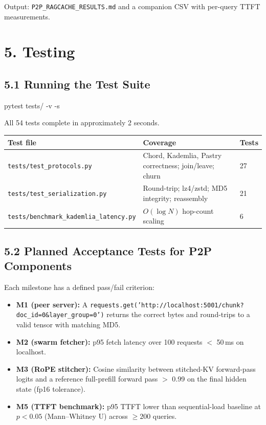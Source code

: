 \documentclass[11pt]{article}
\newenvironment{Shaded}{\small}{}
\newcommand{\AttributeTok}[1]{\textcolor[rgb]{0.49,0.56,0.16}{#1}}
\newcommand{\ExtensionTok}[1]{#1}
\providecommand{\tightlist}{%
  \setlength{\itemsep}{0pt}\setlength{\parskip}{0pt}}
\begin{document}
Output: \texttt{P2P\_RAGCACHE\_RESULTS.md} and a companion CSV with
per-query TTFT measurements.

\section{5. Testing}

\subsection{5.1 Running the Test Suite}

\begin{Shaded}
\begin{Highlighting}[]
\ExtensionTok{pytest} tests/ \AttributeTok{-v} \AttributeTok{-s}
\end{Highlighting}
\end{Shaded}

All 54 tests complete in approximately 2 seconds.

\begin{longtable}[]{@{}lll@{}}
\toprule
Test file & Coverage & Tests \\
\midrule
\endhead
\bottomrule
\endlastfoot
\texttt{tests/test\_protocols.py} & Chord, Kademlia, Pastry correctness; join/leave; churn & 27 \\
\texttt{tests/test\_serialization.py} & Round-trip; lz4/zstd; MD5 integrity; reassembly & 21 \\
\texttt{tests/benchmark\_kademlia\_latency.py} & $O(\log N)$ hop-count scaling & 6 \\
\end{longtable}

\subsection{5.2 Planned Acceptance Tests for P2P Components}

Each milestone has a defined pass/fail criterion:

\begin{itemize}
\tightlist
\item
  \textbf{M1 (peer server):} A \texttt{requests.get('http://localhost:5001/chunk?doc\_id=0\&layer\_group=0')}
  returns the correct bytes and round-trips to a valid tensor with matching MD5.
\item
  \textbf{M2 (swarm fetcher):} p95 fetch latency over 100 requests $<$ 50\,ms on localhost.
\item
  \textbf{M3 (RoPE stitcher):} Cosine similarity between stitched-KV forward-pass logits
  and a reference full-prefill forward pass $>$ 0.99 on the final hidden state (fp16 tolerance).
\item
  \textbf{M5 (TTFT benchmark):} p95 TTFT lower than sequential-load baseline at
  $p < 0.05$ (Mann--Whitney U) across $\geq 200$ queries.
\end{itemize}
\end{document}
